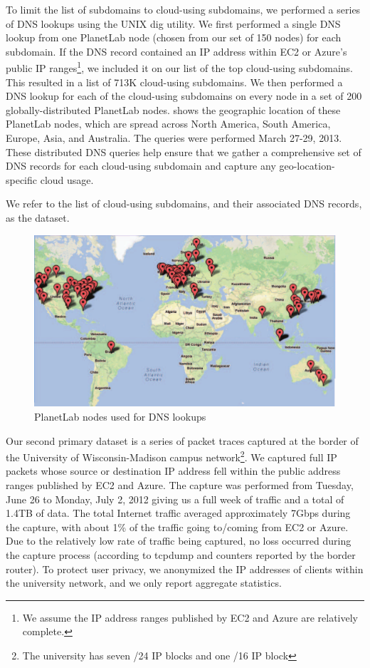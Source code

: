 To limit the list of subdomains to cloud-using subdomains, we performed a series of
DNS lookups using the UNIX dig utility. We first performed a single
DNS lookup from one PlanetLab node (chosen from our set of 150 nodes)
for each subdomain. If the DNS record contained an IP address within
EC2 or Azure's public IP ranges\footnote{We assume the IP address ranges 
published by EC2 and Azure are relatively complete.}, we included it on our 
list of the top
cloud-using subdomains. This resulted in a list of 713K cloud-using
subdomains. We then performed a DNS lookup for each of the cloud-using
subdomains on every node in a set of 200 globally-distributed
PlanetLab nodes.  shows the geographic location of 
these PlanetLab nodes, which are spread across North America, South America,
Europe, Asia, and Australia.
The queries were performed March 27-29,
2013. These distributed DNS queries help ensure that we gather a
comprehensive set of DNS records for each cloud-using subdomain and
capture any geo-location-specific cloud usage.

We refer to the list of cloud-using subdomains, and their associated
DNS records, as the \alexadata dataset. 


 \begin{figure}[tb]
 \centering
 \includegraphics[width=0.55\columnwidth]{figures/cloudmeasure/imag_sec2/nodes_deploy.pdf}
 \caption{PlanetLab nodes used for DNS lookups\label{fig:nodes_deploy}}
 \end{figure}


 Our second primary dataset is a
series of packet traces captured at the border of the University of
Wisconsin-Madison campus network\footnote{The university has seven /24 IP blocks and one /16
IP block}. We captured full IP packets whose source or destination IP
address fell within the public address ranges published by EC2 and
Azure. The capture was performed from Tuesday, June 26 to Monday, July
2, 2012 giving us a full week of traffic and a total of 1.4TB of data.
The total Internet traffic averaged approximately 7Gbps during the capture,
with about 1\% of the traffic going to/coming from EC2 or Azure. Due to the
relatively low rate of traffic being captured, no loss occurred during the
capture process (according to tcpdump and counters reported by the border
router). 
To protect user privacy, we anonymized the IP addresses of clients
within the university network, and we only report aggregate
statistics.

